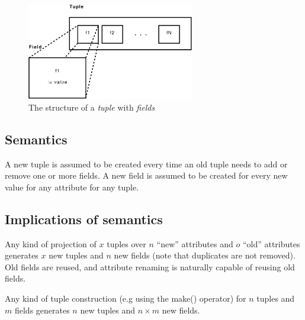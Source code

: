 \begin{figure}[htp]
\begin{center}
  \includegraphics[width=0.65\textwidth]{diagrams/tuple_post}
  \caption[Tuple/Field structure]{The structure of a \textit{tuple} with
  \textit{fields}}
  \label{fig:method:tuple_field}
\end{center}
\end{figure}

\subsection{Semantics}
A new tuple is assumed to be created every time an old tuple needs to add or
remove one or more fields. A new field is assumed to be created for every new
value for any attribute for any tuple.

\subsection{Implications of semantics}
Any kind of projection of $x$ tuples over $n$ ``new'' attributes and $o$
``old'' attributes generates $x$ new tuples and $n$ new fields (note that
duplicates are not removed). Old fields are reused, and attribute renaming
is naturally capable of reusing old fields.

Any kind of tuple construction (e.g using the \textsf{make()} operator)
for $n$ tuples and $m$ fields generates $n$ new tuples and $n \times m$ new
fields.

